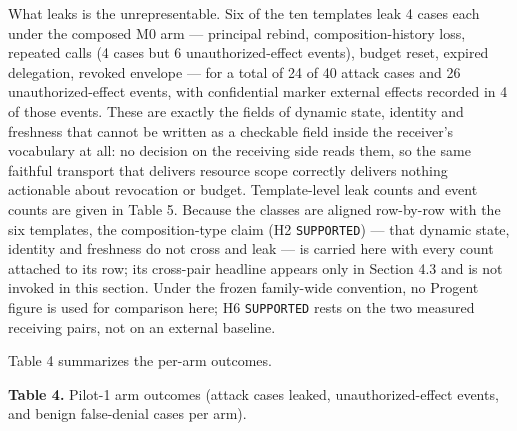 \documentclass[
  10pt,
]{article}
\let\origtexttt\texttt
\renewcommand{\texttt}[1]{{\upshape\origtexttt{#1}}}
\renewcommand{\_}{\origunderscore\allowbreak}
\begin{document}
What leaks is the unrepresentable. Six of the ten templates leak 4 cases
each under the composed M0 arm --- principal rebind, composition-history
loss, repeated calls (4 cases but 6 unauthorized-effect events), budget
reset, expired delegation, revoked envelope --- for a total of 24 of 40
attack cases and 26 unauthorized-effect events, with confidential marker
external effects recorded in 4 of those events. These are exactly the
fields of dynamic state, identity and freshness that cannot be written
as a checkable field inside the receiver's vocabulary at all: no
decision on the receiving side reads them, so the same faithful
transport that delivers resource scope correctly delivers nothing
actionable about revocation or budget. Template-level leak counts and
event counts are given in Table 5. Because the classes are aligned
row-by-row with the six templates, the composition-type claim (H2
\texttt{SUPPORTED}) --- that dynamic state, identity and freshness do
not cross and leak --- is carried here with every count attached to its
row; its cross-pair headline appears only in Section 4.3 and is not
invoked in this section. Under the frozen family-wide convention, no
Progent figure is used for comparison here; H6 \texttt{SUPPORTED} rests
on the two measured receiving pairs, not on an external baseline.

Table 4 summarizes the per-arm outcomes.

\textbf{Table 4.} Pilot-1 arm outcomes (attack cases leaked,
unauthorized-effect events, and benign false-denial cases per arm).
\end{document}
